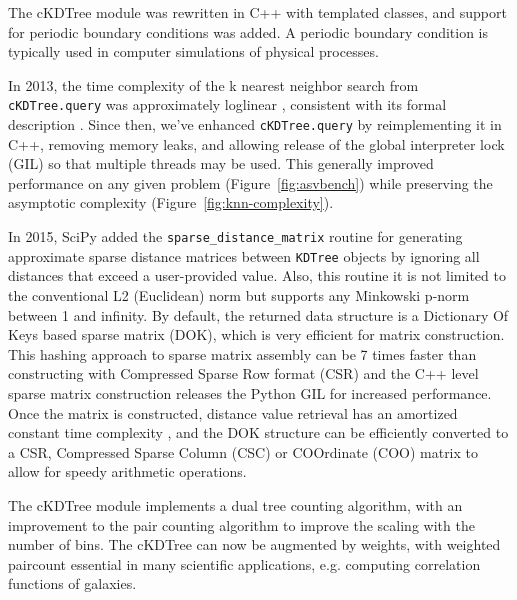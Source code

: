 The cKDTree module was rewritten in C++ with templated classes, and support for
periodic boundary conditions was added. A periodic boundary condition is typically 
used in computer simulations of physical processes.

In 2013, the time complexity of the k nearest neighbor search from
\texttt{cKDTree.query} was approximately loglinear \cite{knn-jake},
consistent with its formal description \cite{kdtree-search-algo}.
Since then, we've enhanced \texttt{cKDTree.query} by reimplementing it in
C++, removing memory leaks, and allowing release of the global interpreter lock (GIL) so that
multiple threads may be used\cite{gh-4374}. This generally improved
performance on any given problem (Figure~\ref{fig:asvbench}) while
preserving the asymptotic complexity (Figure~\ref{fig:knn-complexity}).

In 2015, SciPy added the \texttt{sparse\_distance\_matrix} routine for generating 
approximate sparse distance matrices between \texttt{KDTree} objects by ignoring 
all distances that exceed a user-provided value. Also, this routine it is not 
limited to the conventional L2 (Euclidean) norm but supports any Minkowski 
p-norm between 1 and infinity. By default, the returned data structure is a 
Dictionary Of Keys based sparse matrix (DOK), which is very efficient for matrix 
construction. This hashing approach to sparse matrix assembly can be 7 times 
faster than constructing with Compressed Sparse Row format (CSR) 
\cite{10.1007/978-3-540-75755-9_107} and the C++ level sparse matrix construction 
releases the Python GIL for increased performance. Once the matrix is constructed, 
distance value retrieval has an amortized constant time complexity 
\cite{Cormen:2001:IA:580470}, and the DOK structure can be efficiently converted 
to a CSR, Compressed Sparse Column (CSC) or COOrdinate (COO) matrix to allow for 
speedy arithmetic operations.

The cKDTree module implements a dual tree counting algorithm\cite{Moore2000ar},
with an improvement to the pair counting algorithm to improve the scaling
with the number of bins. The cKDTree can now be augmented by weights, with 
weighted paircount essential in many scientific applications, e.g. computing 
correlation functions of galaxies\cite{0004-637X-750-1-38}.
